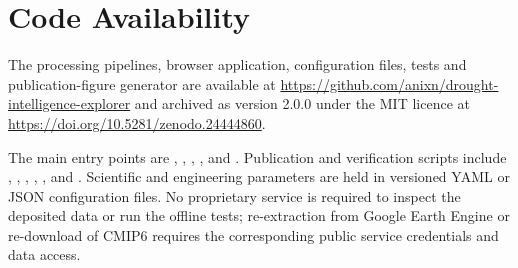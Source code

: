 \documentclass[11pt,a4paper]{article}
\begin{document}
\section*{Code Availability}
The processing pipelines, browser application, configuration files, tests and publication-figure generator are available at \url{https://github.com/anixn/drought-intelligence-explorer} and archived as version 2.0.0 under the MIT licence at \url{https://doi.org/10.5281/zenodo.24444860}\citep{DeshmukhSoftware2026}.

The main entry points are , , , ,  and . Publication and verification scripts include , , , , ,  and . Scientific and engineering parameters are held in versioned YAML or JSON configuration files. No proprietary service is required to inspect the deposited data or run the offline tests; re-extraction from Google Earth Engine or re-download of CMIP6 requires the corresponding public service credentials and data access.
\end{document}
